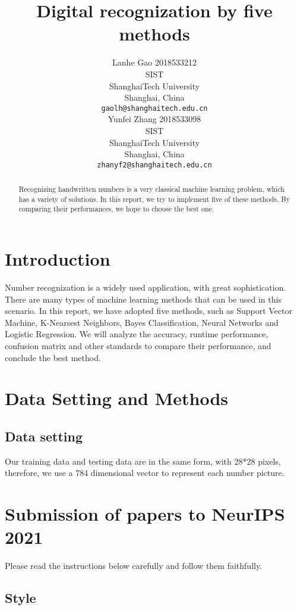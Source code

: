 \documentclass{article}
\title{Digital recognization by five methods}
\author{
	Lanhe Gao 2018533212\\
	SIST\\
	ShanghaiTech University\\
	Shanghai, China \\
	\texttt{gaolh@shanghaitech.edu.cn} \\
	\And
	Yunfei Zhang 2018533098\\
	SIST\\
	ShanghaiTech University\\
	Shanghai, China \\
	\texttt{zhanyf2@shanghaitech.edu.cn} \\
}
\begin{document}
	
	\maketitle
	
	\begin{abstract}
		Recognizing handwritten numbers is a very classical machine learning problem, which has a variety of solutions. In this report, we try to implement five of these methods. By comparing their performances, we hope to choose the best one.
	\end{abstract}

	\section{Introduction}
	
	Number recognization is a widely used application, with great sophistication. There are many types of machine learning methods that can be used in this scenario. In this report, we have adopted five methods, such as Support Vector Machine, K-Nearsest Neighbors, Bayes Classification, Neural Networks and Logistic Regression. We will analyze the accuracy, runtime performance, confusion matrix and other standards to compare their performance, and conclude the best method.
	
	\section{Data Setting and Methods}
	
	\subsection{Data setting}
	
	Our training data and testing data are in the same form, with 28*28 pixels, therefore, we use a 784 dimensional vector to represent each number picture. 
	
	\section{Submission of papers to NeurIPS 2021}
	
	Please read the instructions below carefully and follow them faithfully.
	
	\subsection{Style}
	
\end{document}
